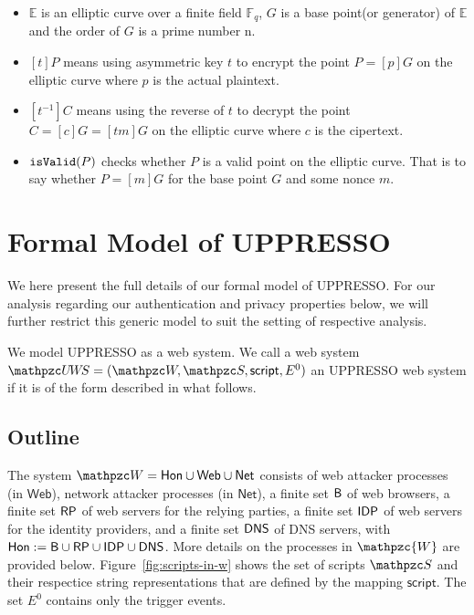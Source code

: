 \documentclass[letterpaper,onecolumn,10pt]{article}
\begin{document}
\begin{itemize}
  \item $\mathbb{E}$ is an elliptic curve over a finite field $\mathbb{F}_q$, $G$ is a base point(or generator) of $\mathbb{E}$ and the order of $G$ is a prime number n.
  \item $[t]P$ means using asymmetric key $t$ to encrypt the point $P=[p]G$ on the elliptic curve where $p$ is the actual plaintext.
  \item $[t^{-1}]C$ means using the reverse of $t$ to decrypt the point $C=[c]G=[tm]G$ on the elliptic curve where $c$ is the cipertext.  
  \item $\mathtt{isValid}(P)$ checks whether $P$ is a valid point on the elliptic curve. That is to say whether $P=[m]G$ for the base point $G$ and some nonce $m$.
\end{itemize}

\section{Formal Model of UPPRESSO}
\label{app:model-uppresso}
We here present the full details of our formal model of UPPRESSO. For our analysis regarding our authentication and privacy properties below, we will further restrict this generic model to suit the setting of respective analysis.\par
We model UPPRESSO as a web system. We call a web system $\uppressowebsystem=(\bidsystem, \scriptset, \mathsf{script}, E^0)$ an UPPRESSO web system if it is of the form described in what follows.

\subsection{Outline}\label{app:outlineuppressomodel}
The system $\bidsystem=\mathsf{Hon}\cup \mathsf{Web} \cup \mathsf{Net}$ consists of web attacker processes (in $\mathsf{Web}$), network attacker processes (in $\mathsf{Net}$), a finite set $\mathsf{B}$ of web browsers, a finite set $\mathsf{RP}$ of web servers for the relying parties, a finite set $\mathsf{IDP}$ of web servers for the identity providers, and a finite set $\mathsf{DNS}$ of DNS servers, 
with $\mathsf{Hon} := \mathsf{B} \cup \mathsf{RP} \cup \mathsf{IDP} \cup \mathsf{DNS}$. More details on the processes in $\mathpzc{W}$ are provided below. 
%
Figure~\ref{fig:scripts-in-w} shows the set of scripts $\scriptset$ 
and their respectice string representations that are defined by the 
mapping $\mathsf{script}$. 
%
The set $E^0$ contains only the trigger events.
\end{document}
